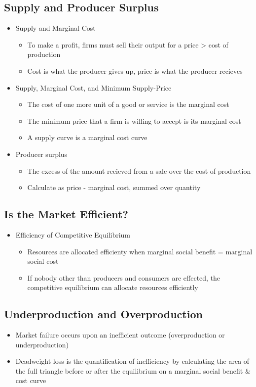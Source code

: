 \documentclass[11pt]{article}
\begin{document}
\subsection{Supply and Producer Surplus}
\label{sec:org80f674c}
\begin{itemize}
\item Supply and Marginal Cost
\begin{itemize}
\item To make a profit, firms must sell their output for a price > cost of production
\item Cost is what the producer gives up, price is what the producer recieves
\end{itemize}
\item Supply, Marginal Cost, and Minimum Supply-Price
\begin{itemize}
\item The cost of one more unit of a good or service is the marginal cost
\item The minimum price that a firm is willing to accept is its marginal cost
\item A supply curve is a marginal cost curve
\end{itemize}
\item Producer surplus
\begin{itemize}
\item The excess of the amount recieved from a sale over the cost of production
\item Calculate as price - marginal cost, summed over quantity
\end{itemize}
\end{itemize}
\subsection{Is the Market Efficient?}
\label{sec:org34225d9}
\begin{itemize}
\item Efficiency of Competitive Equilibrium
\begin{itemize}
\item Resources are allocated efficienty when marginal social benefit = marginal social cost
\item If nobody other than producers and consumers are effected, the competitive equilibrium
can allocate resources efficiently
\end{itemize}
\end{itemize}
\subsection{Underproduction and Overproduction}
\label{sec:org1070b71}
\begin{itemize}
\item Market failure occurs upon an inefficient outcome (overproduction or underproduction)
\item Deadweight loss is the quantification of inefficiency by calculating the area of the 
full triangle before or after the equilibrium on a marginal social benefit \& cost curve
\end{itemize}
\end{document}
